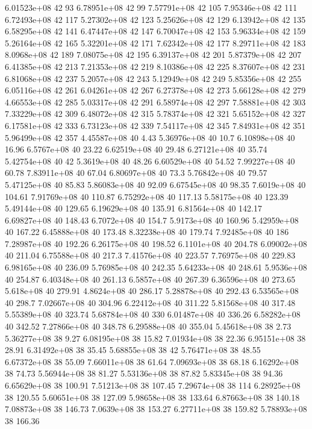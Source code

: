 6.01523e+08 42 93
6.78951e+08 42 99
7.57791e+08 42 105
7.95346e+08 42 111
6.72493e+08 42 117
5.27302e+08 42 123
5.25626e+08 42 129
6.13942e+08 42 135
6.58295e+08 42 141
6.47447e+08 42 147
6.70047e+08 42 153
5.96334e+08 42 159
5.26164e+08 42 165
5.32201e+08 42 171
7.62342e+08 42 177
8.29711e+08 42 183
8.0968e+08 42 189
7.08075e+08 42 195
6.39137e+08 42 201
5.87379e+08 42 207
6.41385e+08 42 213
7.21353e+08 42 219
8.10386e+08 42 225
8.37607e+08 42 231
6.81068e+08 42 237
5.2057e+08 42 243
5.12949e+08 42 249
5.85356e+08 42 255
6.05116e+08 42 261
6.04261e+08 42 267
6.27378e+08 42 273
5.66128e+08 42 279
4.66553e+08 42 285
5.03317e+08 42 291
6.58974e+08 42 297
7.58881e+08 42 303
7.33229e+08 42 309
6.48072e+08 42 315
5.78374e+08 42 321
5.65152e+08 42 327
6.17581e+08 42 333
6.73123e+08 42 339
7.54117e+08 42 345
7.84931e+08 42 351
5.96499e+08 42 357
4.45587e+08 40 4.43
5.36976e+08 40 10.7
6.10898e+08 40 16.96
6.5767e+08 40 23.22
6.62519e+08 40 29.48
6.27121e+08 40 35.74
5.42754e+08 40 42
5.3619e+08 40 48.26
6.60529e+08 40 54.52
7.99227e+08 40 60.78
7.83911e+08 40 67.04
6.80697e+08 40 73.3
5.76842e+08 40 79.57
5.47125e+08 40 85.83
5.86083e+08 40 92.09
6.67545e+08 40 98.35
7.6019e+08 40 104.61
7.91769e+08 40 110.87
6.75292e+08 40 117.13
5.58175e+08 40 123.39
5.49144e+08 40 129.65
6.19629e+08 40 135.91
6.81564e+08 40 142.17
6.69827e+08 40 148.43
6.7072e+08 40 154.7
5.9173e+08 40 160.96
5.42959e+08 40 167.22
6.45888e+08 40 173.48
8.32238e+08 40 179.74
7.92485e+08 40 186
7.28987e+08 40 192.26
6.26175e+08 40 198.52
6.1101e+08 40 204.78
6.09002e+08 40 211.04
6.75588e+08 40 217.3
7.41576e+08 40 223.57
7.76975e+08 40 229.83
6.98165e+08 40 236.09
5.76985e+08 40 242.35
5.64233e+08 40 248.61
5.9536e+08 40 254.87
6.40348e+08 40 261.13
6.5857e+08 40 267.39
6.36596e+08 40 273.65
5.618e+08 40 279.91
4.8624e+08 40 286.17
5.28878e+08 40 292.43
6.53565e+08 40 298.7
7.02667e+08 40 304.96
6.22412e+08 40 311.22
5.81568e+08 40 317.48
5.55389e+08 40 323.74
5.68784e+08 40 330
6.01487e+08 40 336.26
6.58282e+08 40 342.52
7.27866e+08 40 348.78
6.29588e+08 40 355.04
5.45618e+08 38 2.73
5.36277e+08 38 9.27
6.08195e+08 38 15.82
7.01934e+08 38 22.36
6.95151e+08 38 28.91
6.31492e+08 38 35.45
5.68855e+08 38 42
5.76471e+08 38 48.55
6.67372e+08 38 55.09
7.66011e+08 38 61.64
7.09693e+08 38 68.18
6.16292e+08 38 74.73
5.56944e+08 38 81.27
5.53136e+08 38 87.82
5.83345e+08 38 94.36
6.65629e+08 38 100.91
7.51213e+08 38 107.45
7.29674e+08 38 114
6.28925e+08 38 120.55
5.60651e+08 38 127.09
5.98658e+08 38 133.64
6.87663e+08 38 140.18
7.08873e+08 38 146.73
7.0639e+08 38 153.27
6.27711e+08 38 159.82
5.78893e+08 38 166.36
